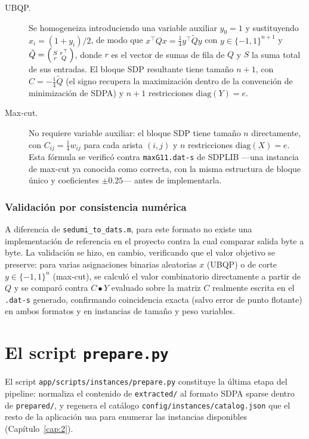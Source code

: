 \begin{description}
    \item[UBQP.] Se homogeneiza introduciendo una variable auxiliar $y_0=1$
    y sustituyendo $x_i=(1+y_i)/2$, de modo que $x^\top Q x = \tfrac{1}{4}
    y^\top \tilde{Q} y$ con $y\in\{-1,1\}^{n+1}$ y
    $\tilde{Q}=\begin{psmallmatrix}S & r^\top\\ r & Q\end{psmallmatrix}$,
    donde $r$ es el vector de sumas de fila de $Q$ y $S$ la suma total de
    sus entradas. El bloque SDP resultante tiene tama\~no $n+1$, con
    $C=-\tfrac{1}{4}\tilde{Q}$ (el signo recupera la maximizaci\'on dentro
    de la convenci\'on de minimizaci\'on de SDPA) y $n+1$ restricciones
    $\mathrm{diag}(Y)=e$.
    \item[Max-cut.] No requiere variable auxiliar: el bloque SDP tiene
    tama\~no $n$ directamente, con $C_{ij}=\tfrac{1}{4}w_{ij}$ para cada
    arista $(i,j)$ y $n$ restricciones $\mathrm{diag}(X)=e$. Esta f\'ormula
    se verific\'o contra \texttt{maxG11.dat-s} de SDPLIB —una instancia de
    max-cut ya conocida como correcta, con la misma estructura de bloque
    \'unico y coeficientes $\pm0.25$— antes de implementarla.
\end{description}

\subsubsection{Validaci\'on por consistencia num\'erica}

A diferencia de \texttt{sedumi\_to\_dats.m}, para este formato no existe una
implementaci\'on de referencia en el proyecto contra la cual comparar
salida byte a byte. La validaci\'on se hizo, en cambio, verificando que el
valor objetivo se preserve: para varias asignaciones binarias aleatorias
$x$ (UBQP) o de corte $y\in\{-1,1\}^n$ (max-cut), se calcul\'o el valor
combinatorio directamente a partir de $Q$ y se compar\'o contra $C\bullet
Y$ evaluado sobre la matriz $C$ realmente escrita en el \texttt{.dat-s}
generado, confirmando coincidencia exacta (salvo error de punto flotante)
en ambos formatos y en instancias de tama\~no y peso variables.

\section{El script \texttt{prepare.py}}
\label{sec:cap3-prepare}

El script \texttt{app/scripts/instances/prepare.py} constituye la \'ultima
etapa del pipeline: normaliza el contenido de \texttt{extracted/} al
formato SDPA sparse dentro de \texttt{prepared/}, y regenera el cat\'alogo
\texttt{config/instances/catalog.json} que el resto de la aplicaci\'on usa
para enumerar las instancias disponibles (Cap\'itulo~\ref{cap:2}).

